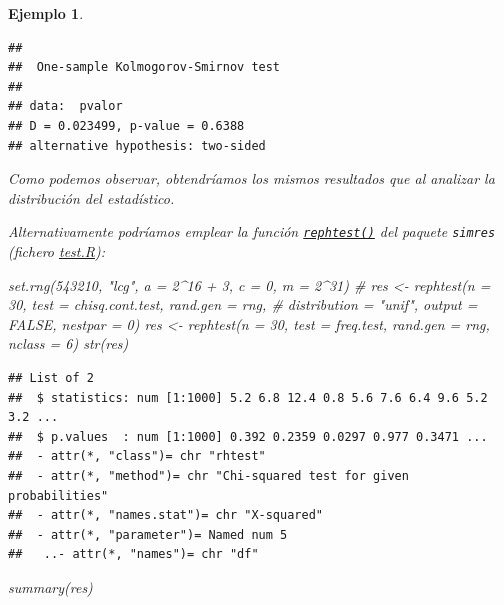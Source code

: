 \documentclass[
]{book}
\newenvironment{Shaded}{\begin{snugshade}}{\end{snugshade}}
\newcommand{\AttributeTok}[1]{\textcolor[rgb]{0.77,0.63,0.00}{#1}}
\newcommand{\CommentTok}[1]{\textcolor[rgb]{0.56,0.35,0.01}{\textit{#1}}}
\newcommand{\DecValTok}[1]{\textcolor[rgb]{0.00,0.00,0.81}{#1}}
\newcommand{\FunctionTok}[1]{\textcolor[rgb]{0.00,0.00,0.00}{#1}}
\newcommand{\NormalTok}[1]{#1}
\newcommand{\OtherTok}[1]{\textcolor[rgb]{0.56,0.35,0.01}{#1}}
\newcommand{\SpecialCharTok}[1]{\textcolor[rgb]{0.00,0.00,0.00}{#1}}
\newcommand{\StringTok}[1]{\textcolor[rgb]{0.31,0.60,0.02}{#1}}
\theoremstyle{break}
\newtheorem{example}{Ejemplo}[chapter]
\theoremstyle{nonumberplain}
\begin{document}
\begin{example}
\begin{verbatim}
## 
##  One-sample Kolmogorov-Smirnov test
## 
## data:  pvalor
## D = 0.023499, p-value = 0.6388
## alternative hypothesis: two-sided
\end{verbatim}

Como podemos observar, obtendríamos los mismos resultados que al analizar la distribución del estadístico.

Alternativamente podríamos emplear la función \href{https://rubenfcasal.github.io/simres/reference/rephtest.html}{\texttt{rephtest()}} del paquete \texttt{simres} (fichero \href{R/test.R}{\emph{test.R}}):

\begin{Shaded}
\begin{Highlighting}[]
\FunctionTok{set.rng}\NormalTok{(}\DecValTok{543210}\NormalTok{, }\StringTok{"lcg"}\NormalTok{, }\AttributeTok{a =} \DecValTok{2}\SpecialCharTok{\^{}}\DecValTok{16} \SpecialCharTok{+} \DecValTok{3}\NormalTok{, }\AttributeTok{c =} \DecValTok{0}\NormalTok{, }\AttributeTok{m =} \DecValTok{2}\SpecialCharTok{\^{}}\DecValTok{31}\NormalTok{)}
\CommentTok{\# res \textless{}{-} rephtest(n = 30, test = chisq.cont.test, rand.gen = rng,}
\CommentTok{\#          distribution = "unif", output = FALSE, nestpar = 0)}
\NormalTok{res }\OtherTok{\textless{}{-}} \FunctionTok{rephtest}\NormalTok{(}\AttributeTok{n =} \DecValTok{30}\NormalTok{, }\AttributeTok{test =}\NormalTok{ freq.test, }\AttributeTok{rand.gen =}\NormalTok{ rng, }\AttributeTok{nclass =} \DecValTok{6}\NormalTok{)}
\FunctionTok{str}\NormalTok{(res)}
\end{Highlighting}
\end{Shaded}

\begin{verbatim}
## List of 2
##  $ statistics: num [1:1000] 5.2 6.8 12.4 0.8 5.6 7.6 6.4 9.6 5.2 3.2 ...
##  $ p.values  : num [1:1000] 0.392 0.2359 0.0297 0.977 0.3471 ...
##  - attr(*, "class")= chr "rhtest"
##  - attr(*, "method")= chr "Chi-squared test for given probabilities"
##  - attr(*, "names.stat")= chr "X-squared"
##  - attr(*, "parameter")= Named num 5
##   ..- attr(*, "names")= chr "df"
\end{verbatim}

\begin{Shaded}
\begin{Highlighting}[]
\FunctionTok{summary}\NormalTok{(res)}
\end{Highlighting}
\end{Shaded}


\end{example}
\end{document}
